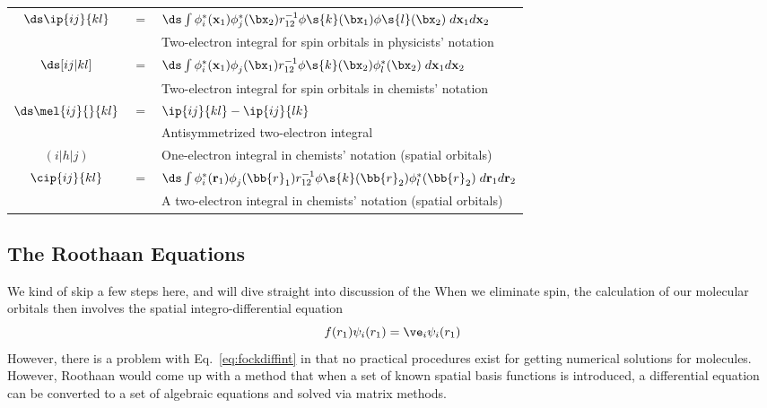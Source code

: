 \documentclass[11pt]{article}
\begin{document}
\begin{table}[H]
\begin{tabular}{ccl}
                           \midrule[0pt]
		  $\ds \ip{ij}{kl}$    & $=$ & $\ds\int  \phi_i^*(\mathbf{x}_1)\phi_j^*(\bx_2)r_{12}^{-1}\phi\s{k}(\bx_1)\phi\s{l}(\bx_2)\; d\mathbf{x}_1d\mathbf{x}_2$                    \\
		                       &     & Two-electron integral for spin orbitals in physicists' notation                                                                             \\
                           \midrule[0pt]
		   $ \ds [ij|kl] $     & $=$ & $\ds \int \phi_i^*( \mathbf{x}_1) \phi_j^{} (\bx_1) r_{12}^{-1} \phi\s{k} (\bx_2) \phi_{l}^* (\bx_2)\;d\mathbf{x}_1d\mathbf{x}_2 $          \\
 		                       &     & Two-electron integral for spin orbitals in chemists' notation                                                                               \\
                            \midrule[0pt]
		$\ds \mel{ij}{}{kl} $  & $=$ & $ \ip{ij}{kl} -  \ip{ij}{lk}$                                                                                                               \\
		                       &     & Antisymmetrized two-electron integral                                                                                                       \\
                           \midrule[0pt]
		   $({i}|{h}|{j})$     &     & One-electron integral in chemists' notation (spatial orbitals)                                                                              \\
                           \midrule[0pt]
		    $\cip{ij}{kl}$     & $=$ & $\ds \int \phi_i^*( \mathbf{r}_1) \phi_j^{} (\bb{r}_1) r_{12}^{-1} \phi\s{k} (\bb{r}_2) \phi_{l}^* (\bb{r}_2)\;d\mathbf{r}_1d\mathbf{r}_2$  \\
		                       &     & A two-electron integral in chemists' notation (spatial orbitals)                                                                            \\
		\bottomrule
	\end{tabular}
\end{table}


\subsection{The Roothaan Equations}
We kind of skip a few steps here, and will dive straight into discussion of the 
When we eliminate spin, the calculation of our molecular orbitals then involves the spatial integro-differential equation 
\begin{equation}
f(r_1) \psi_i(r_1) = \ve_i \psi_i (r_1) \label{eq:fockdiffint}
\end{equation}
However, there is a problem with Eq.\ \eqref{eq:fockdiffint} in that no practical procedures exist for getting numerical solutions for molecules. However, Roothaan would come up with a method that when a set of known spatial basis functions is introduced, a differential equation can be converted to a set of algebraic equations and solved via matrix methods. 
\end{document}

